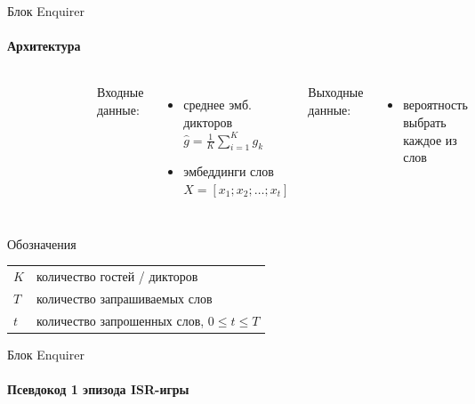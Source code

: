 \documentclass[aspectratio=169]{beamer}
\begin{document}
\begin{frame}{Блок Enquirer}
\framesubtitle{Архитектура}
    \begin{columns}
    
    \begin{figure}[bht]
    \includegraphics[width=.9\textwidth]{enquirer.png}
    \end{figure}

    Входные данные:
    \begin{itemize}
        \item среднее эмб. дикторов\\
            $\hat{g} = \frac{1}{K}{\sum_{i=1}^{K}{g_k}}$
        \item эмбеддинги слов\\
            $X = [x_1; x_2; \ldots; x_t]$
    \end{itemize}
    Выходные данные:
    \begin{itemize}
        \item вероятность выбрать каждое из слов
    \end{itemize}

    \end{columns}

    \begin{block}{Обозначения}
    \begin{tabular}{l l}
        $K$ & количество гостей / дикторов\\
        $T$ & количество запрашиваемых слов\\
        $t$ & количество запрошенных слов, $0 \leq t \leq T$
    \end{tabular}
    \end{block}
\end{frame}

\begin{frame}[fragile]{Блок Enquirer}
\framesubtitle{Псевдокод 1 эпизода ISR-игры}
\footnotesize

\end{frame}
\end{document}
